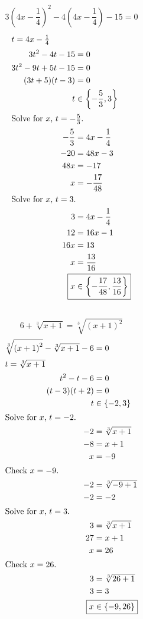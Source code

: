 	\subsection{}
		\[3{\left(4x - \frac{1}{4}\right)}^2 - 4\left(4x - \frac{1}{4}\right) - 15 = 0\]
		\begin{align*}
			\intertext{$t = 4x - \frac{1}{4}$}
			3t^2 - 4t - 15 &= 0 \\
			3t^2 - 9t + 5t - 15 &= 0 \\
			(3t + 5)(t - 3) &= 0 \\
			t &\in \left\{-\frac{5}{3}, 3\right\} \\
			\intertext{Solve for $x$, $t = -\frac{5}{3}$.}
			-\frac{5}{3} &= 4x - \frac{1}{4} \\
			-20 &= 48x - 3 \\
			48x &= -17 \\
			x &= -\frac{17}{48} \\
			\intertext{Solve for $x$, $t = 3$.}
			3 &= 4x - \frac{1}{4} \\
			12 &= 16x - 1 \\
			16x &= 13 \\
			x &= \frac{13}{16} \\
			\Aboxed{x &\in \left\{-\frac{17}{48}, \frac{13}{16}\right\}}
		\end{align*}
		\pagebreak{}

	\subsection{}
		\[6 + \sqrt[3]{x + 1} = \sqrt[3]{{(x + 1)}^2}\]
		\begin{align*}
			\sqrt[3]{{(x + 1)}^2} - \sqrt[3]{x + 1} - 6 &= 0 \\
			\intertext{$t = \sqrt[3]{x + 1}$}
			t^2 - t - 6 &= 0 \\
			(t - 3)(t + 2) &= 0 \\
			t &\in \{-2, 3\} \\
			\intertext{Solve for $x$, $t = -2$.}
			-2 &= \sqrt[3]{x + 1} \\
			-8 &= x + 1 \\
			x &= -9 \\
			\intertext{Check $x = -9$.}
			-2 &= \sqrt[3]{-9 + 1} \\
			-2 &= -2 \\
			\intertext{Solve for $x$, $t = 3$.}
			3 &= \sqrt[3]{x + 1} \\
			27 &= x + 1 \\
			x &= 26 \\
			\intertext{Check $x = 26$.}
			3 &= \sqrt[3]{26 + 1} \\
			3 &= 3 \\
			\Aboxed{x &\in \{-9, 26\}}
		\end{align*}
		\pagebreak{}

